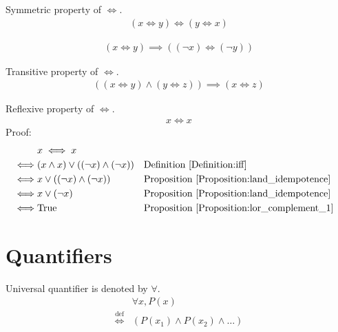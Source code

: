 \begin{prop}
\label{Proposition:iff_symmetric}
Symmetric property of $\iff$.
\begin{align*}
(x \iff y) \iff (y \iff x)
\end{align*}
\end{prop}

\begin{prop}
\label{Proposition:iff_lnot}
\begin{align*}
(x \iff y) \implies ((\lnot x) \iff (\lnot y))
\end{align*}
\end{prop}

\begin{prop}
\label{Proposition:iff_transitive}
Transitive property of $\iff$.
\begin{align*}
((x \iff y) \land (y \iff z)) \implies (x \iff z)
\end{align*}
\end{prop}

\begin{prop}
\label{Proposition:iff_reflexive}
Reflexive property of $\iff$.
\begin{align*}
x \iff x
\end{align*}
Proof:
\begin{align*}
& x \iff x \\
\iff & (x \land x) \lor ((\lnot x) \land (\lnot x))
&& \text{Definition \ref{Definition:iff}} \\
\iff & x \lor ((\lnot x) \land (\lnot x))
&& \text{Proposition \ref{Proposition:land_idempotence}} \\
\iff & x \lor (\lnot x)
&& \text{Proposition \ref{Proposition:land_idempotence}} \\
\iff & \text{True}
&& \text{Proposition \ref{Proposition:lor_complement_1}} \\
\end{align*}
\end{prop}

\section{Quantifiers}
\begin{defn}
Universal quantifier is denoted by $\forall$.
\begin{align*}
& \forall x, P(x) \\
\overset{\operatorname{def}}{\iff} & (P(x_1) \land P(x_2) \land \dots)
\end{align*}
\end{defn}

